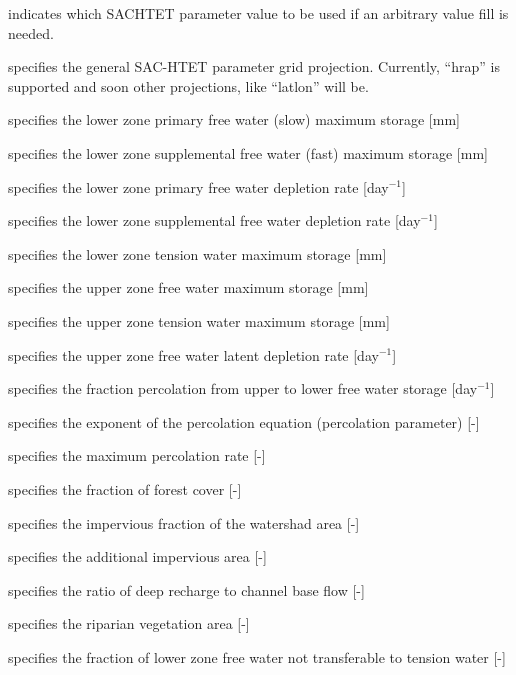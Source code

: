   indicates which SACHTET parameter 
 value to be used if an arbitrary value fill is needed. 

  specifies the general SAC-HTET parameter
  grid projection.  Currently, ``hrap'' is supported and soon other projections,
  like ``latlon'' will be.

  specifies the
 lower zone primary free water (slow) maximum storage [mm]

  specifies the
 lower zone supplemental free water (fast) maximum storage [mm]

  specifies the
 lower zone primary free water depletion rate [day$^{-1}$]

  specifies the
 lower zone supplemental free water depletion rate [day$^{-1}$]

  specifies the
 lower zone tension water maximum storage [mm]

  specifies the
 upper zone free water maximum storage [mm]

  specifies the
 upper zone tension water maximum storage [mm]

  specifies the
 upper zone free water latent depletion rate [day$^{-1}$]

  specifies the
 fraction percolation from upper to lower free water storage [day$^{-1}$]

  specifies the
 exponent of the percolation equation (percolation parameter) [-]

  specifies the
 maximum percolation rate [-]

  specifies the
 fraction of forest cover [-]

  specifies the
 impervious fraction of the watershad area [-]

  specifies the
 additional impervious area [-]

  specifies the
 ratio of deep recharge to channel base flow [-]

  specifies the
 riparian vegetation area [-]

  specifies the
 fraction of lower zone free water not transferable to tension water [-]

